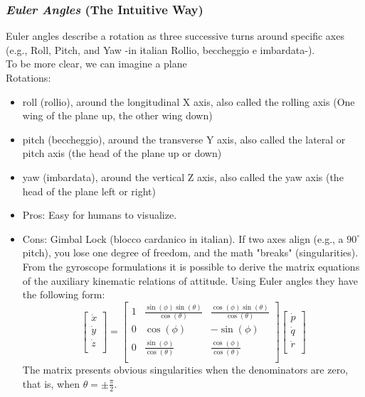 \documentclass[a4paper,10pt]{article}
\begin{document}
\subsubsection{\emph{Euler Angles} (The Intuitive Way)}
Euler angles describe a rotation as three successive turns around specific axes (e.g., Roll, Pitch, and Yaw -in italian Rollio, beccheggio e imbardata-).\\
To be more clear, we can imagine a plane\\
Rotations:
\begin{itemize}
\item roll (rollio), around the longitudinal X axis, also called the rolling axis (One wing of the plane up, the other wing down)
\item pitch (beccheggio), around the transverse Y axis, also called the lateral or pitch axis (the head of the plane up or down)
\item yaw (imbardata), around the vertical Z axis, also called the yaw axis (the head of the plane left or right)
\end{itemize}
\begin{itemize}
\item Pros: Easy for humans to visualize.
\item Cons: Gimbal Lock (blocco cardanico in italian). If two axes align (e.g., a \(90^{\circ}\)pitch), you lose one degree of freedom, and the math "breaks" (singularities). From the gyroscope formulations it is possible to derive the matrix equations of the auxiliary kinematic relations of attitude. Using Euler angles they have the following form:\\
\[
\begin{bmatrix}
\dot{x}\\
\dot{y}\\
\dot{z}\\
\end{bmatrix}
=
\begin{bmatrix}
1 & \frac{\sin(\phi)\sin(\theta)}{\cos(\theta)}& \frac{\cos(\phi)\sin(\theta)}{\cos(\theta)}\\
0 & \cos(\phi)& -\sin(\phi)\\
0 & \frac{\sin(\phi)}{\cos(\theta)}& \frac{\cos(\phi)}{\cos(\theta)} \\
\end{bmatrix}
\begin{bmatrix}
\dot{p}\\
\dot{q}\\
\dot{r}\\
\end{bmatrix}
\]
The matrix presents obvious singularities when the denominators are zero, that is, when \({\displaystyle \theta =\pm {\frac {\pi }{2}}}\).
\end{itemize}
\end{document}
